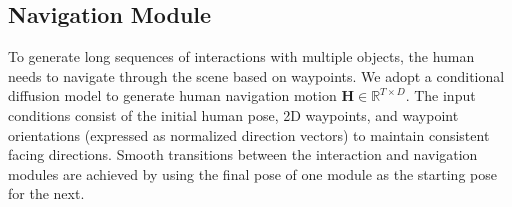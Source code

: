\subsection{Navigation Module}
\label{sec:low_level_navigation}
To generate long sequences of interactions with multiple objects, the human needs to navigate through the scene based on waypoints.
We adopt a conditional diffusion model to generate human navigation motion $\bm{H} \in \mathbb{R}^{T \times D}$. The input conditions consist of the initial human pose, 2D waypoints, and waypoint orientations (expressed as normalized direction vectors) to maintain consistent facing directions. 
Smooth transitions between the interaction and navigation modules are achieved by using the final pose of one module as the starting pose for the next.






